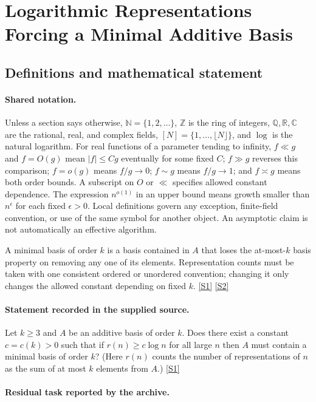 \documentclass[11pt,a4paper]{article}
\newcommand{\N}{\mathbb{N}}
\newcommand{\Z}{\mathbb{Z}}
\newcommand{\Q}{\mathbb{Q}}
\newcommand{\R}{\mathbb{R}}
\newcommand{\C}{\mathbb{C}}
\newcommand{\sref}[2]{\hyperlink{source:#1:#2}{[S#2]}}
\begin{document}
\section{Logarithmic Representations Forcing a Minimal Additive Basis}\label{statement}


\subsection{Definitions and mathematical statement}

\paragraph{Shared notation.}Unless a section says otherwise, $\N=\{1,2,\ldots\}$,
$\Z$ is the ring of integers, $\Q,\R,\C$ are the rational, real, and complex
fields, $[N]=\{1,\ldots,\lfloor N\rfloor\}$, and $\log$ is the natural
logarithm. For real functions of a parameter tending to infinity,
$f\ll g$ and $f=O(g)$ mean $|f|\leq Cg$ eventually for some fixed $C$;
$f\gg g$ reverses this comparison; $f=o(g)$ means $f/g\to0$;
$f\sim g$ means $f/g\to1$; and $f\asymp g$ means both order bounds.
A subscript on $O$ or $\ll$ specifies allowed constant dependence.
The expression $n^{o(1)}$ in an upper bound means growth smaller than
$n^\epsilon$ for each fixed $\epsilon>0$. Local definitions govern any
exception, finite-field convention, or use of the same symbol for another
object. An asymptotic claim is not automatically an effective algorithm.



A minimal basis of order $k$ is a basis contained in $A$ that loses the at-most-$k$ basis property on removing any one of its elements. Representation counts must be taken with one consistent ordered or unordered convention; changing it only changes the allowed constant depending on fixed $k$. \sref{statement}{1} \sref{statement}{2}

\paragraph{Statement recorded in the supplied source.}
Let $k\geq 3$ and $A$ be an additive basis of order $k$. Does there exist a constant $c=c(k)>0$ such that if $r(n)\geq c\log n$ for all large $n$ then $A$ must contain a minimal basis of order $k$? (Here $r(n)$ counts the number of representations of $n$ as the sum of at most $k$ elements from $A$.) \sref{statement}{1}

\paragraph{Residual task reported by the archive.}
\end{document}
